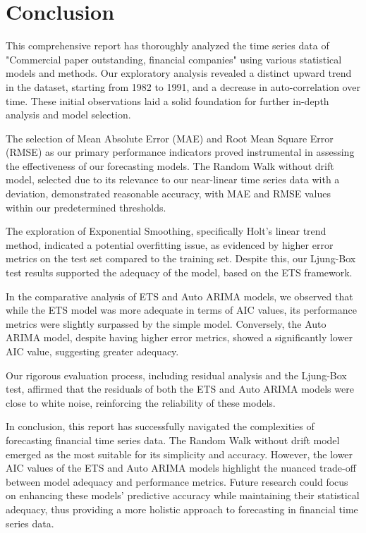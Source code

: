 \section{Conclusion}\label{sec:conclusion}

This comprehensive report has thoroughly analyzed the time series data of "Commercial paper outstanding, financial companies" using various statistical models and methods. Our exploratory analysis revealed a distinct upward trend in the dataset, starting from 1982 to 1991, and a decrease in auto-correlation over time. These initial observations laid a solid foundation for further in-depth analysis and model selection.

The selection of Mean Absolute Error (MAE) and Root Mean Square Error (RMSE) as our primary performance indicators proved instrumental in assessing the effectiveness of our forecasting models. The Random Walk without drift model, selected due to its relevance to our near-linear time series data with a deviation, demonstrated reasonable accuracy, with MAE and RMSE values within our predetermined thresholds.

The exploration of Exponential Smoothing, specifically Holt's linear trend method, indicated a potential overfitting issue, as evidenced by higher error metrics on the test set compared to the training set. Despite this, our Ljung-Box test results supported the adequacy of the model, based on the ETS framework.

In the comparative analysis of ETS and Auto ARIMA models, we observed that while the ETS model was more adequate in terms of AIC values, its performance metrics were slightly surpassed by the simple model. Conversely, the Auto ARIMA model, despite having higher error metrics, showed a significantly lower AIC value, suggesting greater adequacy.

Our rigorous evaluation process, including residual analysis and the Ljung-Box test, affirmed that the residuals of both the ETS and Auto ARIMA models were close to white noise, reinforcing the reliability of these models.

In conclusion, this report has successfully navigated the complexities of forecasting financial time series data. The Random Walk without drift model emerged as the most suitable for its simplicity and accuracy. However, the lower AIC values of the ETS and Auto ARIMA models highlight the nuanced trade-off between model adequacy and performance metrics. Future research could focus on enhancing these models' predictive accuracy while maintaining their statistical adequacy, thus providing a more holistic approach to forecasting in financial time series data.